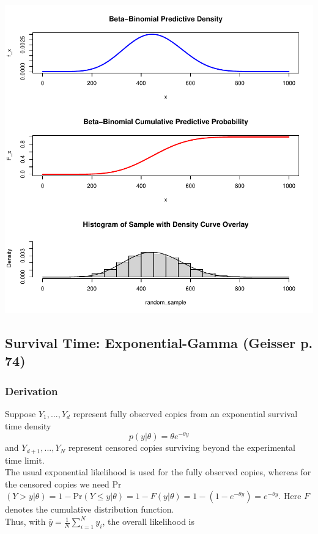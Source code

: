 \documentclass[12pt, a4paper]{article}
\begin{document}
\includegraphics{Thesis_v3-003}


    \subsection{Survival Time:  Exponential-Gamma (Geisser p. 74)}


    \subsubsection{Derivation}

      Suppose $Y_1,...,Y_d$ represent fully observed copies from an exponential survival time density
          $$p(y|\theta) = \theta e^{-\theta y}$$
      and $Y_{d+1},...,Y_N$ represent censored copies surviving beyond the experimental time limit.  \\

\noindent The usual exponential likelihood is used for the fully observed copies, whereas for the censored copies we need Pr$(Y > y | \theta) = 1 - \text{Pr}(Y\leq y | \theta) = 1 - F(y|\theta) = 1 - (1 - e^{-\theta y}) = e^{-\theta y}$.  Here $F$ denotes the cumulative distribution function.\\

\noindent Thus, with $\bar{y} = \frac{1}{N}\sum_{i=1}^N y_i$, the overall likelihood is
\end{document}
